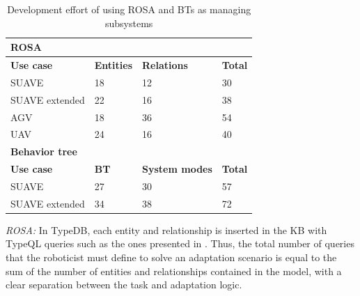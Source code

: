 \begin{table}[htbp]
\centering
\caption{Development effort of using ROSA and BTs as managing subsystems}\label{tab:dev_effort}
\begin{tabularx}{\linewidth}{XXXX}
\hline
\multicolumn{4}{l}{\textbf{ROSA}}                                                    \\ \hline
\textbf{Use case} & \textbf{Entities}      & \textbf{Relations} & \textbf{Total} \\ \hline
SUAVE             & 18                     & 12                     & 30             \\
SUAVE  extended    & 22                     & 16                     & 38             \\
AGV      & 18                     & 36                     & 54             \\
UAV               & 24                     & 16                     & 40             \\ \hline
\multicolumn{4}{l}{\textbf{Behavior tree}}                                           \\ \hline
\textbf{Use case} & \textbf{BT} & \textbf{System modes}  & \textbf{Total} \\ \hline
SUAVE             & 27                     & 30                     & 57             \\
SUAVE extended    & 34                     & 38                     & 72             \\ \hline
\end{tabularx}%
\end{table}

\emph{ROSA:}
In TypeDB, each entity and relationship is inserted in the KB with TypeQL queries such as the ones presented in .
Thus, the total number of queries that the roboticist must define to solve an adaptation scenario is equal to the sum of the number of entities and relationships contained in the model, with a clear separation between the task and adaptation logic.

